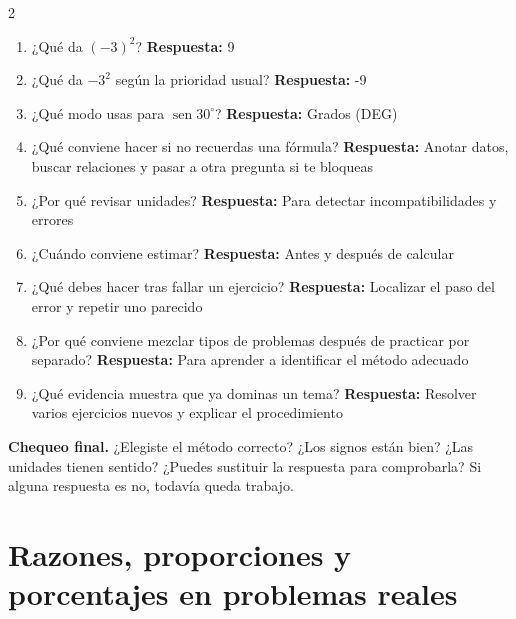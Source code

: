 \documentclass[10pt,oneside,openany]{book}
\newcommand{\sen}{\operatorname{sen}}\newcommand{\Prob}{\operatorname{P}}
\begin{document}
\begin{multicols}{2}\begin{enumerate}

\item ¿Qué da $(-3)^2$? \textbf{Respuesta:} 9

\item ¿Qué da $-3^2$ según la prioridad usual? \textbf{Respuesta:} -9

\item ¿Qué modo usas para $\sen 30^\circ$? \textbf{Respuesta:} Grados (DEG)

\item ¿Qué conviene hacer si no recuerdas una fórmula? \textbf{Respuesta:} Anotar datos, buscar relaciones y pasar a otra pregunta si te bloqueas

\item ¿Por qué revisar unidades? \textbf{Respuesta:} Para detectar incompatibilidades y errores

\item ¿Cuándo conviene estimar? \textbf{Respuesta:} Antes y después de calcular

\item ¿Qué debes hacer tras fallar un ejercicio? \textbf{Respuesta:} Localizar el paso del error y repetir uno parecido

\item ¿Por qué conviene mezclar tipos de problemas después de practicar por separado? \textbf{Respuesta:} Para aprender a identificar el método adecuado

\item ¿Qué evidencia muestra que ya dominas un tema? \textbf{Respuesta:} Resolver varios ejercicios nuevos y explicar el procedimiento

\end{enumerate}\end{multicols}

\begin{idea}\textbf{Chequeo final.} ¿Elegiste el método correcto? ¿Los signos están bien? ¿Las unidades tienen sentido? ¿Puedes sustituir la respuesta para comprobarla? Si alguna respuesta es no, todavía queda trabajo.\end{idea}



\chapter{Razones, proporciones y porcentajes en problemas reales}
\end{document}
